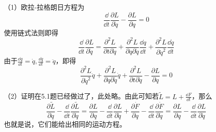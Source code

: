 \begin{solution}
	（1）欧拉-拉格朗日方程为
	\[\frac{\dd }{\dd t}\frac{\partial L}{\partial \dot{q}}-\frac{\partial L}{\partial q}=0\]
	使用链式法则即得
	\[\frac{\dd }{\dd t}\frac{\partial L}{\partial \dot{q}}=\frac{\partial^2 L}{\partial t\partial \dot{q}}+\frac{\partial^2 L}{\partial q\partial \dot{q}}\frac{\dd q}{\dd t}+\frac{\partial^2 L}{\partial \dot{q}^2}\frac{\dd \dot{q}}{\dd t}\]
	由于\(\frac{\dd q}{\dd t}=\dot{q},\frac{\dd \dot{q}}{\dd t}=\ddot{q}\)，即得
	\[\frac{\partial^2 L}{\partial \dot{q}^2}\ddot{q}+\frac{\partial^2 L}{\partial q\partial \dot{q}}\dot{q}+\frac{\partial^2 L}{\partial t\partial \dot{q}}-\frac{\partial L}{\partial q}=0\]
	
	（2）证明在5.1题已经做过了，此处略。由此可知若\(\tilde{L}=L+\frac{\dd F}{\dd t}\)，那么
	\[\frac{\partial \tilde{L}}{\partial q}-\frac{\dd }{\dd t}\frac{\partial \tilde{L}}{\partial \dot{q}}=\frac{\partial L}{\partial q}-\frac{\dd}{\dd t}\frac{\partial L}{\partial \dot{q}}+\frac{\partial \dot{F}}{\partial q}-\frac{\dd}{\dd t}\frac{\partial \dot{F}}{\partial \dot{q}}=\frac{\partial L}{\partial q}-\frac{\dd}{\dd t}\frac{\partial L}{\partial \dot{q}}\]
	也就是说，它们能给出相同的运动方程。
\end{solution}




